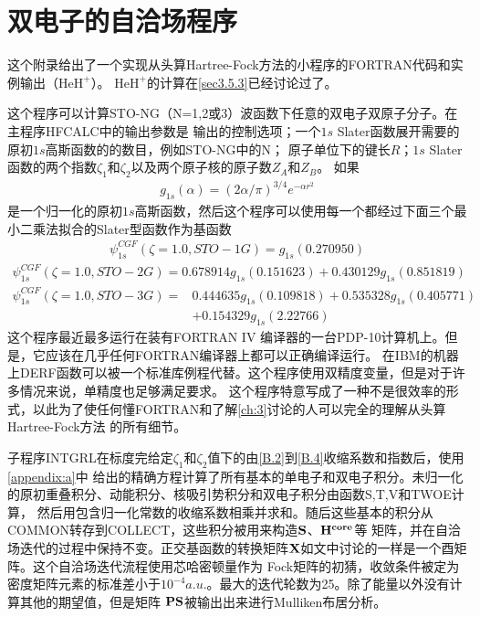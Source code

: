 \chapter{双电子的自洽场程序}

这个附录给出了一个实现从头算Hartree-Fock方法的小程序的FORTRAN代码和实例输出（$\mathrm{HeH}^+$）。
$\mathrm{HeH}^+$的计算在\autoref{sec3.5.3}已经讨论过了。

这个程序可以计算STO-NG（N=1,2或3）波函数下任意的双电子双原子分子。在主程序HFCALC中的输出参数是
输出的控制选项；一个$1s$ Slater函数展开需要的原初$1s$高斯函数的的数目，例如STO-NG中的N；
原子单位下的键长$R$；$1s$ Slater函数的两个指数$\zeta_1$和$\zeta_2$以及两个原子核的原子数$Z_A$和$Z_B$。
如果
\begin{align}
	\label{B.1}
	g_{1s}(\alpha)=(2\alpha/\pi)^{3/4}e^{-\alpha r^2}
\end{align}
是一个归一化的原初$1s$高斯函数，然后这个程序可以使用每一个都经过下面三个最小二乘法拟合的Slater型函数作为基函数
\begin{align}
	\label{B.2}
	\psi_{1s}^{CGF}(\zeta=1.0,STO-1G)=g_{1s}(0.270950)
\end{align}
\begin{align}
	\label{B.3}
	\psi_{1s}^{CGF}(\zeta=1.0,STO-2G)=0.678914g_{1s}(0.151623)+0.430129g_{1s}(0.851819)
\end{align}
\begin{align}
	\label{B.4}
	\psi_{1s}^{CGF}(\zeta=1.0,STO-3G)=&0.444635g_{1s}(0.109818)+0.535328g_{1s}(0.405771)
    \nonumber\\
                                      &+0.154329g_{1s}(2.22766)
\end{align}
这个程序最近最多运行在装有FORTRAN IV 编译器的一台PDP-10计算机上。但是，它应该在几乎任何FORTRAN编译器上都可以正确编译运行。
在IBM的机器上DERF函数可以被一个标准库例程代替。这个程序使用双精度变量，但是对于许多情况来说，单精度也足够满足要求。
这个程序特意写成了一种不是很效率的形式，以此为了使任何懂FORTRAN和了解\autoref{ch:3}讨论的人可以完全的理解从头算Hartree-Fock方法
的所有细节。

子程序INTGRL在标度完给定$\zeta_1$和$\zeta_2$值下的由\autoref{B.2}到\autoref{B.4}收缩系数和指数后，使用\autoref{appendix:a}中
给出的精确方程计算了所有基本的单电子和双电子积分。未归一化的原初重叠积分、动能积分、核吸引势积分和双电子积分由函数S,T,V和TWOE计算，
然后用包含归一化常数的收缩系数相乘并求和。随后这些基本的积分从COMMON转存到COLLECT，这些积分被用来构造$\bf{S}$、$\bf{H^{core}}$等
矩阵，并在自洽场迭代的过程中保持不变。正交基函数的转换矩阵$\bf{X}$如文中讨论的一样是一个酉矩阵。这个自洽场迭代流程使用芯哈密顿量作为
Fock矩阵的初猜，收敛条件被定为密度矩阵元素的标准差小于$10^{-4}a.u.$。最大的迭代轮数为25。除了能量以外没有计算其他的期望值，但是矩阵
$\bf{PS}$被输出出来进行Mulliken布居分析。

